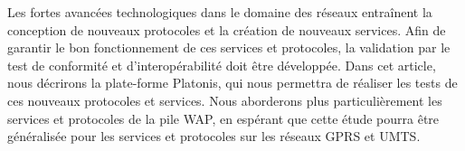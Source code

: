 Les fortes avanc\'ees technologiques dans le domaine des r\'eseaux 
entra\^inent la conception de nouveaux protocoles et la cr\'eation 
de nouveaux services.
Afin de garantir le bon fonctionnement de ces services et 
protocoles, la validation par le test de conformit\'e et 
d'interop\'erabilit\'e doit \^etre d\'evelopp\'ee.
Dans cet article, nous d\'ecrirons la plate-forme Platonis, qui 
nous permettra de r\'ealiser les tests  de ces nouveaux protocoles 
et services. Nous aborderons plus particuli\`erement les services 
et protocoles de la pile WAP, en esp\'erant que cette \'etude 
pourra \^etre g\'en\'eralis\'ee pour les services et protocoles sur 
les r\'eseaux GPRS et UMTS.
